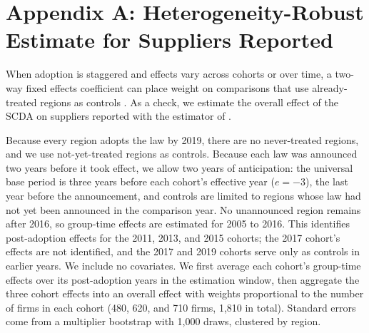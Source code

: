 \documentclass[11pt]{article}
\begin{document}
\clearpage
\appendix
\section*{Appendix A: Heterogeneity-Robust Estimate for Suppliers Reported}

When adoption is staggered and effects vary across cohorts or over time, a two-way fixed effects coefficient can place weight on comparisons that use already-treated regions as controls \citep{gb2021, sa2021, rsbp2023}. As a check, we estimate the overall effect of the SCDA on suppliers reported with the estimator of \citet{cs2021}.

Because every region adopts the law by 2019, there are no never-treated regions, and we use not-yet-treated regions as controls. Because each law was announced two years before it took effect, we allow two years of anticipation: the universal base period is three years before each cohort's effective year ($e = -3$), the last year before the announcement, and controls are limited to regions whose law had not yet been announced in the comparison year. No unannounced region remains after 2016, so group-time effects are estimated for 2005 to 2016. This identifies post-adoption effects for the 2011, 2013, and 2015 cohorts; the 2017 cohort's effects are not identified, and the 2017 and 2019 cohorts serve only as controls in earlier years. We include no covariates. We first average each cohort's group-time effects over its post-adoption years in the estimation window, then aggregate the three cohort effects into an overall effect with weights proportional to the number of firms in each cohort (480, 620, and 710 firms, 1,810 in total). Standard errors come from a multiplier bootstrap with 1,000 draws, clustered by region.
\end{document}
